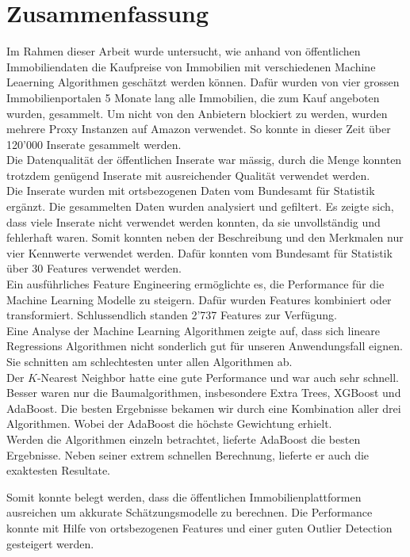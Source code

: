 \section{Zusammenfassung}
Im Rahmen dieser Arbeit wurde untersucht, wie anhand von öffentlichen Immobiliendaten die Kaufpreise von Immobilien mit verschiedenen Machine Leaerning Algorithmen geschätzt werden können. Dafür wurden von vier grossen Immobilienportalen 5 Monate lang alle Immobilien, die zum Kauf angeboten wurden, gesammelt. Um nicht von den Anbietern blockiert zu werden, wurden mehrere Proxy Instanzen auf Amazon verwendet. So konnte in dieser Zeit über 120’000 Inserate gesammelt werden.\\
Die Datenqualität der öffentlichen Inserate war mässig, durch die Menge konnten trotzdem genügend Inserate mit ausreichender Qualität verwendet werden.\\
Die Inserate wurden mit ortsbezogenen Daten vom Bundesamt für Statistik ergänzt. Die gesammelten Daten wurden analysiert und gefiltert. Es zeigte sich, dass viele Inserate nicht verwendet werden konnten, da sie unvollständig und fehlerhaft waren. Somit konnten neben der Beschreibung und den Merkmalen nur vier Kennwerte verwendet werden. Dafür konnten vom Bundesamt für Statistik über 30 Features verwendet werden.\\
Ein ausführliches Feature Engineering ermöglichte es, die Performance für die Machine Learning Modelle zu steigern. Dafür wurden Features kombiniert oder transformiert. Schlussendlich standen 2'737 Features zur Verfügung.\\
Eine Analyse der Machine Learning Algorithmen zeigte auf, dass sich lineare Regressions Algorithmen nicht sonderlich gut für unseren Anwendungsfall eignen. Sie schnitten am schlechtesten unter allen Algorithmen ab.\\
Der $K$-Nearest Neighbor hatte eine gute Performance und war auch sehr schnell. Besser waren nur die Baumalgorithmen, insbesondere Extra Trees, XGBoost und AdaBoost. Die besten Ergebnisse bekamen wir durch eine Kombination aller drei Algorithmen. Wobei der AdaBoost die höchste Gewichtung erhielt.\\
Werden die Algorithmen einzeln betrachtet, lieferte AdaBoost die besten Ergebnisse. Neben seiner extrem schnellen Berechnung, lieferte er auch die exaktesten Resultate.

Somit konnte belegt werden, dass die öffentlichen Immobilienplattformen ausreichen um akkurate Schätzungsmodelle zu berechnen. Die Performance konnte mit Hilfe von ortsbezogenen Features und einer guten Outlier Detection gesteigert werden.
